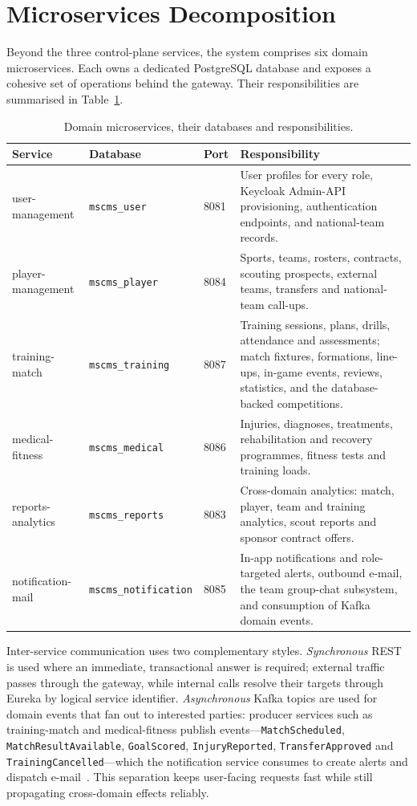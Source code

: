 \section{Microservices Decomposition}
\label{sec:decomposition}

Beyond the three control-plane services, the system comprises six domain microservices.
Each owns a dedicated PostgreSQL database and exposes a cohesive set of operations
behind the gateway. Their responsibilities are summarised in Table~\ref{tab:services}.

\begin{table}[htbp]
\centering
\caption{Domain microservices, their databases and responsibilities.}
\label{tab:services}
\renewcommand{\arraystretch}{1.3}
\begin{tabular}{|p{}|p{}|p{}|p{}|}
\hline
\textbf{Service} & \textbf{Database} & \textbf{Port} & \textbf{Responsibility} \\
\hline
user-management & \texttt{mscms\_user} & 8081 & User profiles for every role, Keycloak Admin-API provisioning, authentication endpoints, and national-team records. \\
\hline
player-management & \texttt{mscms\_player} & 8084 & Sports, teams, rosters, contracts, scouting prospects, external teams, transfers and national-team call-ups. \\
\hline
training-match & \texttt{mscms\_training} & 8087 & Training sessions, plans, drills, attendance and assessments; match fixtures, formations, line-ups, in-game events, reviews, statistics, and the database-backed competitions. \\
\hline
medical-fitness & \texttt{mscms\_medical} & 8086 & Injuries, diagnoses, treatments, rehabilitation and recovery programmes, fitness tests and training loads. \\
\hline
reports-analytics & \texttt{mscms\_reports} & 8083 & Cross-domain analytics: match, player, team and training analytics, scout reports and sponsor contract offers. \\
\hline
notification-mail & \texttt{mscms\_notification} & 8085 & In-app notifications and role-targeted alerts, outbound e-mail, the team group-chat subsystem, and consumption of Kafka domain events. \\
\hline
\end{tabular}
\end{table}

Inter-service communication uses two complementary styles. \emph{Synchronous} REST is
used where an immediate, transactional answer is required; external traffic passes
through the gateway, while internal calls resolve their targets through Eureka by
logical service identifier. \emph{Asynchronous} Kafka topics are used for domain
events that fan out to interested parties: producer services such as training-match
and medical-fitness publish events---\texttt{MatchScheduled}, \texttt{MatchResult\-Available},
\texttt{GoalScored}, \texttt{InjuryReported}, \texttt{TransferApproved} and
\texttt{TrainingCancelled}---which the notification service consumes to create alerts
and dispatch e-mail~\cite{kafka}. This separation keeps user-facing requests fast
while still propagating cross-domain effects reliably.

